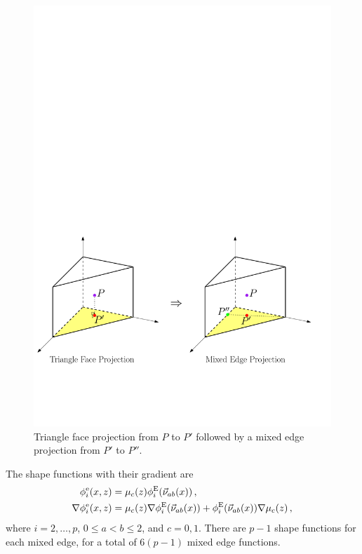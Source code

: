 \begin{figure}[!ht]
\begin{center}
\includegraphics[scale=0.6]{./figures/PrismProjectionTriangle.pdf}
\caption{Triangle face projection from $P$ to $P'$ followed by a mixed edge projection from $P'$ to $P''$.}
\label{fig:PrismProjectionTriangle}
\end{center}
\end{figure}

The shape functions with their gradient are
\begin{equation}
	\begin{aligned}	
		\phi_i^\mathrm{e}(x,z)&=\mu_c(z)\phi_i^{\mathrm{E}}(\vec{\nu}_{ab}(x))\,,\\
		\nabla\phi_i^\mathrm{e}(x,z)&=\mu_c(z)\nabla\phi_i^{\mathrm{E}}(\vec{\nu}_{ab}(x))+\phi_i^{\mathrm{E}}(\vec{\nu}_{ab}(x))\nabla\mu_c(z)\,,
	\end{aligned}\label{eq:PrismH1mixededges}
\end{equation}
where $i=2,\ldots,p$, $0\leq a<b\leq2$, and $c=0,1$. 
There are $p-1$ shape functions for each mixed edge, for a total of $6(p-1)$ mixed edge functions.

